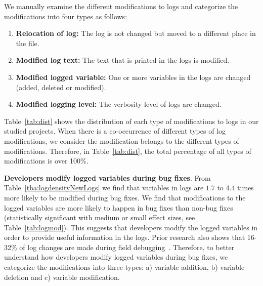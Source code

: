 We manually examine the different modifications to logs and categorize the modifications into four types as follows:
\begin{enumerate}
	\item \textbf{Relocation of log:} The log is not changed but moved to a different place in the file.
	\item \textbf{Modified log text:} The text that is printed in the logs is modified.
	\item \textbf{Modified logged variable:} One or more variables in the logs are changed (added, deleted or modified).
	\item \textbf{Modified logging level:} The verbosity level of logs are changed.
\end{enumerate}
Table~\ref{tab:dist} shows the distribution of each type of modifications to logs in our studied projects. When there is a co-occurrence of different types of log modifications, we consider the modification belongs to the different types of modifications. Therefore, in Table~\ref{tab:dist}, the total percentage of all types of modifications is over 100\%.



\textbf{Developers modify logged variables during bug fixes}. From Table~\ref{tba:logdensityNewLogs} we find that variables in logs are $1.7$ to $4.4$ times more likely to be modified during bug fixes. We find that modifications to the logged variables are more likely to happen in bug fixes than non-bug fixes (statistically significant with medium or small effect sizes, see Table~\ref{tab:logmod}). This suggests that developers modify the logged variables in order to provide useful information in the logs. Prior research also shows that 16-32\% of log changes are made during field debugging~\cite{EMSEIAN}. Therefore, to better understand how developers modify logged variables during bug fixes, we categorize the modifications into three types: a) variable addition, b) variable deletion and c) variable modification.

